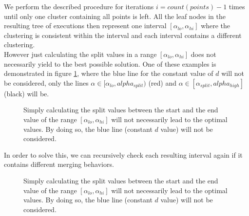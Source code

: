 We perform the described procedure for iterations $i = count(points) -1$ times until only one cluster containing all points is left. All the leaf nodes in the resulting tree of executions then represent one interval $[\alpha_{lo}, \alpha_{hi}]$ where the clustering is consistent within the interval and each interval contains a different clustering.\\

However just calculating the split values in a range $[\alpha_{lo}, \alpha_{hi}]$ does not necessarily yield to the best possible solution. One of these examples is demonstrated in figure \ref{fig:notoptimal}, where the blue line for the constant value of $d$ will not be considered, only the lines $\alpha \in [\alpha_{lo}, alpha_{split})$ (red) and $\alpha \in [\alpha_{split}, alpha_{high}]$ (black) will be.

\begin{figure}[H]
    \centering
    \caption{Simply calculating the split values between the start and the end value of the range $[\alpha_{lo}, \alpha_{hi}]$ will not necessarily lead to the optimal values. By doing so, the blue line (constant $d$ value) will not be considered.}
    \label{fig:notoptimal}
\end{figure}

In order to solve this, we can recursively check each resulting interval again if it contains different merging behaviors.

\begin{figure}[H]
    \centering
    \caption{Simply calculating the split values between the start and the end value of the range $[\alpha_{lo}, \alpha_{hi}]$ will not necessarily lead to the optimal values. By doing so, the blue line (constant $d$ value) will not be considered.}
    \label{fig:notoptimal2}
\end{figure}

